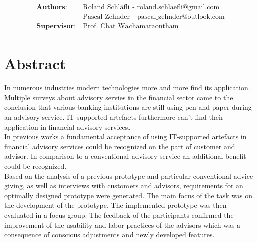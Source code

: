 \documentclass[a4paper,twoside, openright]{report}
\begin{document}
\begin{titlepage}
\vspace*{0.5\baselineskip}



\begin{align*}
\textbf{Authors:} &\ \text{Roland Schläfli - roland.schlaefli@gmail.com} \\
&\ \text{Pascal Zehnder - pascal\_zehnder@outlook.com} \\
\textbf{Supervisor:} &\ \text{Prof. Chat Wachamaraontham} \\
\end{align*}

\endgroup
\end{titlepage}

\newpage


%
\chapter*{Abstract}
In numerous industries modern technologies more and more find its application. Multiple surveys about advisory servies in the financial sector came to the conclusion that various banking institutions are still using pen and paper during an advisory service. IT-supported artefacts furthermore can't find their application in financial advisory services.\\

In previous works a fundamental acceptance of using IT-supported artefacts in financial advisory services could be recognized on the part of customer and advisor. In comparison to a conventional advisory service an additional benefit could be recognized.\\

Based on the analysis of a previous prototype and particular conventional advice giving, as well as interviews with customers and advisors, requirements for an optimally designed prototype were generated. The main focus of the task was on the development of the prototype. The implemented prototype was then evaluated in a focus group. The feedback of the participants confirmed the improvement of the usability and labor practices of the advisors which was a consequence of conscious adjustments and newly developed features.

\tableofcontents

\newpage

\pagestyle{headings}

\newpage


\end{document}
